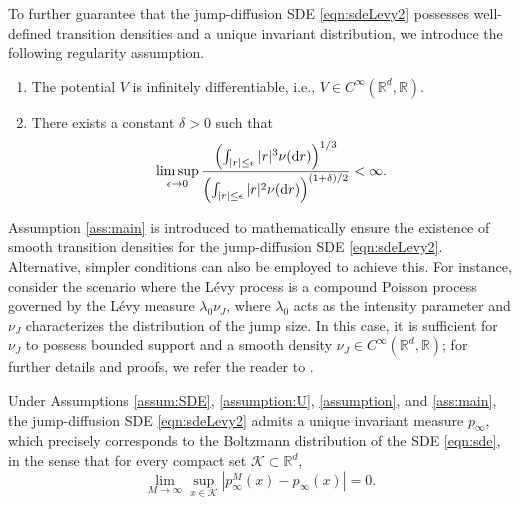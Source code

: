 To further guarantee that the jump-diffusion SDE \eqref{eqn:sdeLevy2} possesses well-defined transition densities and a unique invariant distribution, we introduce the following regularity assumption.

\begin{assumption}\label{ass:main}
    \hfill
    \begin{enumerate}
        \item The potential $V$ is infinitely differentiable, i.e., $V \in C^\infty(\mathbb{R}^d,\mathbb{R})$.
        \item There exists a constant $\delta > 0$ such that  
        \[
            \limsup_{\epsilon \to 0} \frac{\left(\int_{|r| \leq \epsilon} |r|^3 \nu(\mathrm{d} r)\right)^{1/3}}{\left(\int_{|r| \leq \epsilon} |r|^2 \nu(\mathrm{d} r)\right)^{(1 + \delta)/2}} < \infty.
        \]\label{subassum:nu}
    \end{enumerate}
\end{assumption}

\begin{remark}
    Assumption \ref{ass:main} is introduced to mathematically ensure the existence of smooth transition densities for the jump-diffusion SDE \eqref{eqn:sdeLevy2}. Alternative, simpler conditions can also be employed to achieve this. For instance, consider the scenario where the L\'{e}vy process is a compound Poisson process governed by the L\'{e}vy measure $\lambda_0\nu_J$, where $\lambda_0$ acts as the intensity parameter and $\nu_J$ characterizes the distribution of the jump size. In this case, it is sufficient for $\nu_J$ to possess bounded support and a smooth density $\nu_J\in C^\infty(\mathbb{R}^d,\mathbb{R})$; for further details and proofs, we refer the reader to \cite[Theorem 2-29]{bichteler1987malliavin}.
\end{remark}

\begin{theorem}\label{theo:p_infty}
    Under Assumptions \ref{assum:SDE}, \ref{assumption:U}, \ref{assumption}, and \ref{ass:main}, the jump-diffusion SDE \eqref{eqn:sdeLevy2} admits a unique invariant measure $p_\infty$, which precisely corresponds to the Boltzmann distribution of the SDE \eqref{eqn:sde}, in the sense that for every compact set $\mathcal{K}\subset\mathbb{R}^d$,
    \begin{equation}
        \lim_{M\to\infty}\sup_{x\in\mathcal{K}}|p^M_\infty(x)-p_\infty(x)|=0.
    \end{equation}
\end{theorem}


